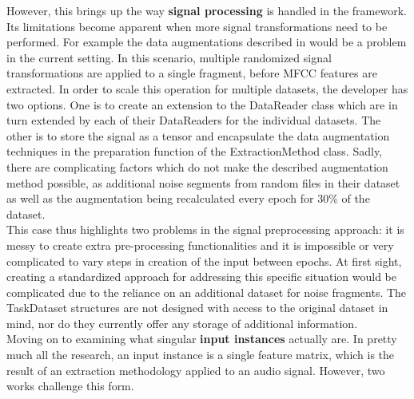 However, this brings up the way \textbf{signal processing} is handled in the framework. Its limitations become apparent when more signal transformations need to be performed. For example the data augmentations described in \cite{lopez2019keyword} would be a problem in the current setting. In this scenario, multiple randomized signal transformations are applied to a single fragment, before MFCC features are extracted. In order to scale this operation for multiple datasets, the developer has two options. One is to create an extension to the DataReader class which are in turn extended by each of their DataReaders for the individual datasets. The other is to store the signal as a tensor and encapsulate the data augmentation techniques in the preparation function of the ExtractionMethod class. Sadly, there are complicating factors which do not make the described augmentation method possible, as additional noise segments from random files in their dataset as well as the augmentation being recalculated every epoch for 30\% of the dataset. \\

This case thus highlights two problems in the signal preprocessing approach: it is messy to create extra pre-processing functionalities and it is impossible or very complicated to vary steps in creation of the input between epochs. At first sight, creating a standardized approach for addressing this specific situation would be complicated due to the reliance on an additional dataset for noise fragments. The TaskDataset structures are not designed with access to the original dataset in mind, nor do they currently offer any storage of additional information.\\

Moving on to examining what singular \textbf{input instances} actually are. In pretty much all the research, an input instance is a single feature matrix, which is the result of an extraction methodology applied to an audio signal. However, two works challenge this form.\\

